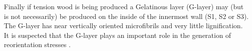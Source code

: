 Finally if tension wood is being produced a Gelatinous layer (G-layer)
may (but is not necessarily) be produced on the inside of the innermost wall (S1, S2 or S3)\cite{gardiner2014biology}. The
G-layer has near vertically oriented microfibrils and very little lignification.
It is suspected that the G-layer plays an important role in the generation of
reorientation stresses \cite{Pilate_2004}.
